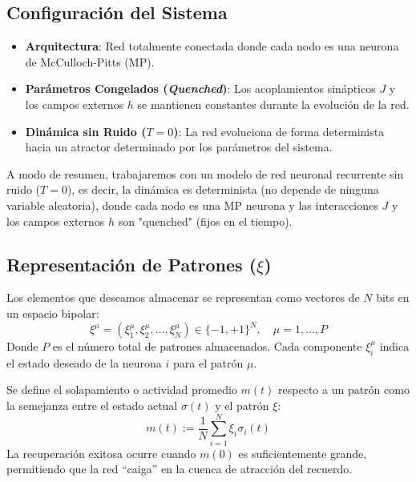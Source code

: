 \subsection{Configuración del Sistema}
\begin{itemize}
    \item \textbf{Arquitectura}: Red totalmente conectada donde cada nodo es una neurona de McCulloch-Pitts (MP).
    \item \textbf{Parámetros Congelados (\textit{Quenched})}: Los acoplamientos sinápticos $J$ y los campos externos $h$ se mantienen constantes durante la evolución de la red.
    \item \textbf{Dinámica sin Ruido ($T=0$)}: La red evoluciona de forma determinista hacia un atractor determinado por los parámetros del sistema.
\end{itemize}

\noindent
A modo de resumen, trabajaremos con un modelo de red neuronal recurrente sin ruido ($T=0$), es decir, la dinámica es determinista (no depende de ninguna variable aleatoria), donde cada nodo es una MP neurona y las interacciones $J$ y los campos externos $h$ son "quenched" (fijos en el tiempo).

\subsection{Representación de Patrones ($\xi$)}
\noindent
Los elementos que deseamos almacenar se representan como vectores de $N$ bits en un espacio bipolar:
\begin{equation}
    \xi^{\mu} = (\xi_{1}^{\mu}, \xi_{2}^{\mu}, \dots, \xi_{N}^{\mu}) \in \{-1, +1\}^{N}, \quad \mu = 1, \dots, P
\end{equation}
Donde $P$ es el número total de patrones almacenados. Cada componente $\xi_{i}^{\mu}$ indica el estado deseado de la neurona $i$ para el patrón $\mu$.

\begin{definicion}
    Se define el solapamiento o actividad promedio $m(t)$ respecto a un patrón como la semejanza entre el estado actual $\sigma(t)$ y el patrón $\xi$:
    \begin{equation}
        m(t) := \frac{1}{N} \sum_{i=1}^{N} \xi_{i} \sigma_{i}(t)
    \end{equation}
    La recuperación exitosa ocurre cuando $m(0)$ es suficientemente grande, permitiendo que la red ``caiga'' en la cuenca de atracción del recuerdo.
\end{definicion}


